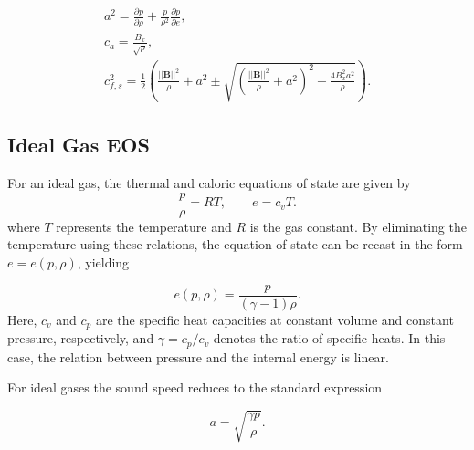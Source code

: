 \documentclass[a4paper,fleqn]{cas-sc}
\theoremstyle{definition}
\theoremstyle{remark}
\begin{document}
\begin{equation}
\begin{gathered}
    a^2 = \frac{\partial p}{\partial \rho} + \frac{p}{\rho^2} \frac{\partial p}{\partial e}, \\
    c_a = \frac{B_x}{\sqrt{\rho}},\\
    c_{f,s}^2 =
\frac{1}{2}
\left(
\frac{||\mathbf{B}||^2}{\rho} + a^2
\pm
\sqrt{
\left(
\frac{||\mathbf{B}||^2}{\rho} + a^2
\right)^2
-
\frac{4 B_x^2 a^2}{\rho}
}
\right).
\end{gathered}
\end{equation}




\subsection{Ideal Gas EOS}
\label{sec:ideal gas eos}
For an ideal gas, the thermal and caloric equations of state are given by
\begin{equation}
\frac{p}{\rho} = R T, \qquad e = c_v T.
\end{equation}
where $T$ represents the temperature and $R$ is the gas constant. By eliminating the temperature using these relations, the equation of state
can be recast in the form $e = e(p,\rho)$, yielding

\begin{equation}
e(p,\rho) = \frac{p}{(\gamma - 1)\rho}.
\end{equation}
Here, $c_v$ and $c_p$ are the specific heat capacities at constant volume and constant
pressure, respectively, and $\gamma = c_p / c_v$ denotes the ratio of specific heats. In this case, the relation between pressure and the internal energy is linear.

For ideal gases the sound speed reduces to the standard expression

\begin{equation}
    a = \sqrt{\frac{\gamma p}{\rho}}.
\end{equation}
\end{document}
